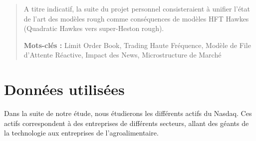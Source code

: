 \documentclass[10pt,a4paper]{article}
\theoremstyle{definition}
\theoremstyle{remark}
\begin{document}
\begin{titlepage}
\begin{center}
\begin{minipage}{0.8\textwidth}
\begin{abstract}
    A titre indicatif, la suite du projet personnel consisteraient à unifier l'état de l'art des modèles rough comme conséquences de modèles HFT Hawkes (Quadratic Hawkes vers super-Heston rough).

            \vspace{0.5cm}
    \textbf{Mots-clés :} Limit Order Book, Trading Haute Fréquence, Modèle de File d'Attente Réactive, Impact des News, Microstructure de Marché
\end{abstract}
            \end{minipage}

            \vfill
            
            
        \end{center}
    \end{titlepage}

    \newpage
    \tableofcontents
    \thispagestyle{empty}

    \newpage
    \setcounter{page}{1}
    
    
\section{Données utilisées}
Dans la suite de notre étude, nous étudierons les différents actifs du Nasdaq. Ces actifs correspondent à des entreprises de différents secteurs, allant des géants de la technologie aux entreprises de l'agroalimentaire.
\end{document}
